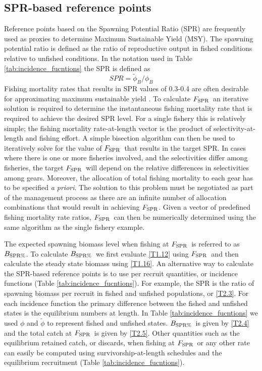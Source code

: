 \documentclass[12pt,letterpaper]{article}
\newcommand{\fspr}{$F_{\textnormal{SPR}}$}
\newcommand{\bspr}{$B_{\textnormal{SPR\%}}$}
\begin{document}
    \subsection*{SPR-based reference points} %
    \label{sub:spr_based_reference_points}
    Reference points based on the Spawning Potential Ratio (SPR) are frequently used as proxies to determine Maximum Sustainable Yield (MSY).  The spawning potential ratio is defined as the ratio of reproductive output in fished conditions relative to unfished conditions.  In the notation used in Table  \ref{tab:incidence_fucntions} the SPR is defined as
    \begin{equation}
      SPR = \tilde{\phi}_B/\phi_B
    \end{equation}
    Fishing mortality rates that results in SPR values of 0.3-0.4 are often desirable for approximating maximum sustainable yield \citep{clark2002f}.  To calculate \fspr\ an iterative solution is required to determine the instantaneous fishing mortality rate that is required to achieve the desired SPR level.  For a single fishery this is relatively simple; the fishing mortality rate-at-length vector is the product of selectivity-at-length and fishing effort.  A simple bisection algorithm can then be used to iteratively solve for the value of \fspr\ that results in the target SPR.  In cases where there is one or more fisheries involved, and the selectivities differ among fisheries, the target \fspr\ will depend on the relative differences in selectivities among gears.  Moreover, the allocation of total fishing mortality to each gear has to be specified \textit{a priori}.  The solution to this problem must be negotiated as part of the management process as there are an infinite number of allocation combinations that would result in achieving \fspr.  Given a vector of predefined fishing mortality rate ratios, \fspr\ can then be numerically determined using the same algorithm as the single fishery example.

    The expected spawning biomass level when fishing at \fspr\ is referred to as \bspr.  To calculate \bspr\ we first evaluate \eqref{T1.12} using \fspr\ and then calculate the steady state biomass using \eqref{T1.16}. An alternative way to calculate the SPR-based reference points is to use per recruit quantities, or incidence functions (Table \ref{tab:incidence_fucntions}). For example, the SPR is the ratio of spawning biomass per recruit in fished and unfished populations, or \eqref{T2.3}. For each incidence function the primary difference between the fished and unfished states is the equilibrium numbers at length.  In Table \ref{tab:incidence_fucntions} we used $\phi$ and $\tilde{\phi}$ to represent fished and unfished states.    \bspr\ is given by \eqref{T2.4} and the total catch at \fspr\ is given by \eqref{T2.5}.  Other quantities such as the equilibrium  retained catch, or discards,  when fishing at \fspr\ or any other rate can easily be computed using survivorship-at-length schedules and the equilibrium recruitment (Table \ref{tab:incidence_fucntions}).
\end{document}
